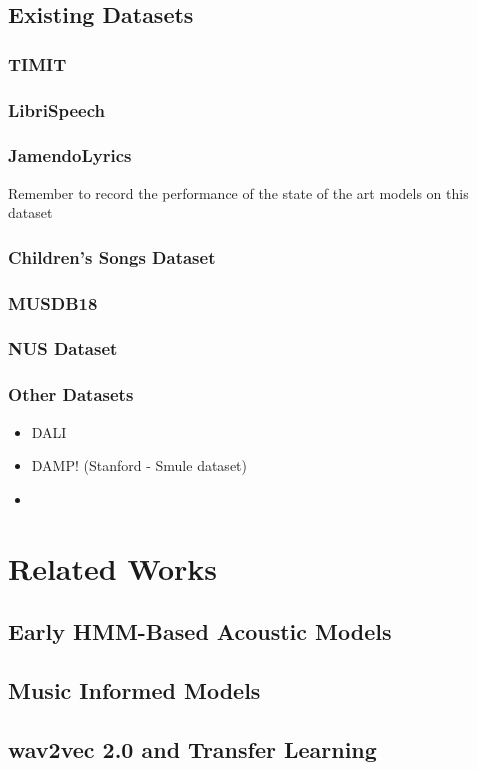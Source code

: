 \documentclass[12pt]{article}
\begin{document}
\begin{multicols*}{2}
\subsection{Existing Datasets}
\subsubsection{TIMIT}
\subsubsection{LibriSpeech}
\subsubsection{JamendoLyrics}
Remember to record the performance of the state of the art models on this dataset
\subsubsection{Children's Songs Dataset}
\subsubsection{MUSDB18}
\subsubsection{NUS Dataset}
\subsubsection{Other Datasets}
\begin{itemize}
    \item DALI
    \item DAMP! (Stanford - Smule dataset)
    \item
\end{itemize}

\section{Related Works}
\subsection{Early HMM-Based Acoustic Models}
\subsection{Music Informed Models}
\subsection{wav2vec 2.0 and Transfer Learning}

\end{multicols*}
\end{document}
